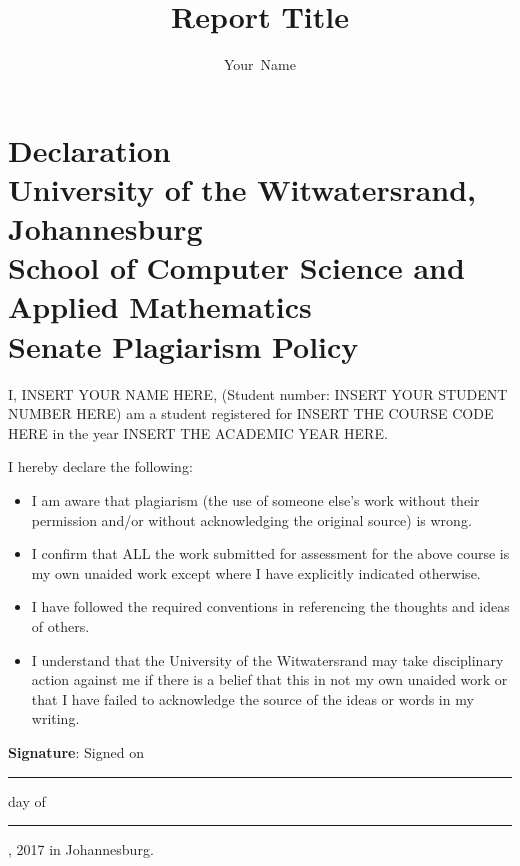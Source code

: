 \documentclass[journal]{IEEEtran}
\title{Report Title}
\author{Your~Name %
}
\begin{document}
\onecolumn
%

\section*{\textbf{Declaration\\
University of the Witwatersrand, Johannesburg\\
School of Computer Science and Applied Mathematics\\
Senate Plagiarism Policy}}  
\vskip 1cm
I, INSERT YOUR NAME HERE, (Student number: INSERT YOUR STUDENT NUMBER HERE) am a student registered for 
INSERT THE COURSE CODE HERE in the year INSERT THE ACADEMIC YEAR HERE.

I hereby declare the following: 
\begin{itemize}
\item
I am aware that plagiarism (the use of someone else's work without their permission and/or without acknowledging the original source) is wrong. 
\item
I confirm that ALL the work submitted for assessment for the above course is my own unaided work except where I have explicitly indicated otherwise. 
\item
I have followed the required conventions in referencing the 
thoughts and ideas of others.
\item
I understand that the University of the Witwatersrand may take 
disciplinary action against me if there is a belief that this in not my own unaided work or that I have failed to acknowledge the source of the ideas or words in my writing.  
\end{itemize}
\vskip 1cm
\noindent
\textbf{Signature}: 
\hspace{2cm}
\vskip 6mm
\noindent
Signed on \rule{3cm}{0.4pt} day of \rule{3cm}{0.4pt} , 2017 in Johannesburg.
\newpage
\twocolumn
\maketitle


 



  



\end{document}
